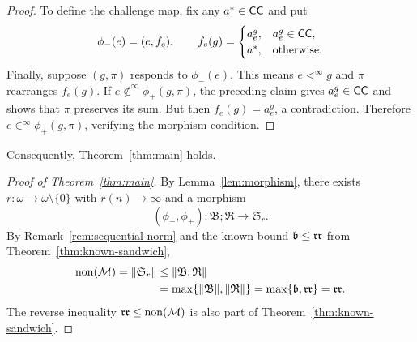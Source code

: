 \begin{proof}
To define the challenge map, fix any $a^*\in\mathsf{CC}$ and put
\[
 \phi_-(e)=(e,f_e),\qquad
 f_e(g)=
 \begin{cases}
  a_e^g,&a_e^g\in\mathsf{CC},\\
  a^*,&\text{otherwise}.
 \end{cases}
\]
Finally, suppose $(g,\pi)$ responds to $\phi_-(e)$. This means
$e<^\infty g$ and $\pi$ rearranges $f_e(g)$.
If $e\notin^\infty\phi_+(g,\pi)$, the preceding claim gives
$a_e^g\in\mathsf{CC}$ and shows that $\pi$ preserves its sum.
But then $f_e(g)=a_e^g$, a contradiction.
Therefore $e\in^\infty\phi_+(g,\pi)$, verifying the morphism condition.
\end{proof}

Consequently, Theorem~\ref{thm:main} holds.
\begin{proof}[Proof of Theorem~\ref{thm:main}]
By Lemma~\ref{lem:morphism}, there exists $r:\omega\to\omega\setminus\{0\}$ with $r(n)\to\infty$ and a morphism
\[
 (\phi_-,\phi_+):\mathfrak B;\mathfrak R\longrightarrow\mathfrak S_r.
\]
By Remark~\ref{rem:sequential-norm} and the known bound
$\mathfrak b\leq\mathfrak{rr}$ from Theorem~\ref{thm:known-sandwich},
\[
\begin{aligned}
 \operatorname{non}(\mathcal M)=\|\mathfrak S_r\|
 &\leq\|\mathfrak B;\mathfrak R\|\\
 &=\max\{\|\mathfrak B\|,\|\mathfrak R\|\}
 =\max\{\mathfrak b,\mathfrak{rr}\}=\mathfrak{rr}.
\end{aligned}
\]
The reverse inequality $\mathfrak{rr}\leq\operatorname{non}(\mathcal M)$ is also part of
Theorem~\ref{thm:known-sandwich}.
\end{proof}
